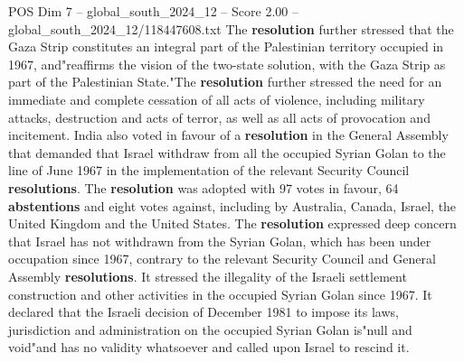\begin{textsample}{POS Dim 7 – global\_south\_2024\_12 – Score 2.00 – global\_south\_2024\_12/118447608.txt}
The \textbf{resolution} further stressed that the Gaza Strip constitutes an integral part of the Palestinian territory occupied in 1967, and"reaffirms the vision of the two-state solution, with the Gaza Strip as part of the Palestinian State."The \textbf{resolution} further stressed the need for an immediate and complete cessation of all acts of violence, including military attacks, destruction and acts of terror, as well as all acts of provocation and incitement.
India also voted in favour of a \textbf{resolution} in the General Assembly that demanded that Israel withdraw from all the occupied Syrian Golan to the line of June 1967 in the implementation of the relevant Security Council \textbf{resolutions}.
The \textbf{resolution} was adopted with 97 votes in favour, 64 \textbf{abstentions} and eight votes against, including by Australia, Canada, Israel, the United Kingdom and the United States.
The \textbf{resolution} expressed deep concern that Israel has not withdrawn from the Syrian Golan, which has been under occupation since 1967, contrary to the relevant Security Council and General Assembly \textbf{resolutions}.
It stressed the illegality of the Israeli settlement construction and other activities in the occupied Syrian Golan since 1967.
It declared that the Israeli decision of December 1981 to impose its laws, jurisdiction and administration on the occupied Syrian Golan is"null and void"and has no validity whatsoever and called upon Israel to rescind it.

\end{textsample}
